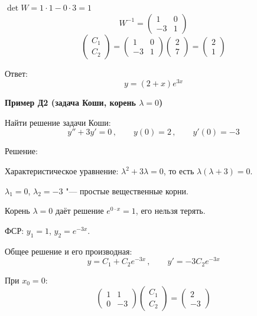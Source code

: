 \documentclass[11pt,a4paper]{article}
\newcommand{\example}[1]{\par\medskip\noindent\textbf{#1}\par\nopagebreak\smallskip}
\begin{document}
$\det W = 1 \cdot 1 - 0 \cdot 3 = 1$
\[
  W^{-1} = \begin{pmatrix} 1 & 0 \\ -3 & 1 \end{pmatrix}
\]
\[
  \begin{pmatrix} C_1 \\ C_2 \end{pmatrix}
  = \begin{pmatrix} 1 & 0 \\ -3 & 1 \end{pmatrix} \begin{pmatrix} 2 \\ 7 \end{pmatrix}
  = \begin{pmatrix} 2 \\ 1 \end{pmatrix}
\]

Ответ:
\[
  y = (2 + x)e^{3x}
\]

\example{Пример Д2 (задача Коши, корень $\lambda = 0$)}

Найти решение задачи Коши:
\[
  y'' + 3y' = 0\,, \qquad y(0) = 2\,, \qquad y'(0) = -3
\]

Решение:

Характеристическое уравнение: $\lambda^2 + 3\lambda = 0$, то есть $\lambda(\lambda + 3) = 0$.

$\lambda_1 = 0$, $\lambda_2 = -3$ "--- простые вещественные корни.

Корень $\lambda = 0$ даёт решение $e^{0 \cdot x} = 1$, его нельзя терять.

ФСР: $y_1 = 1$, $y_2 = e^{-3x}$.

Общее решение и его производная:
\[
  y = C_1 + C_2 e^{-3x}\,, \qquad y' = -3C_2 e^{-3x}
\]

При $x_0 = 0$:
\[
  \begin{pmatrix} 1 & 1 \\ 0 & -3 \end{pmatrix}
  \begin{pmatrix} C_1 \\ C_2 \end{pmatrix}
  =
  \begin{pmatrix} 2 \\ -3 \end{pmatrix}
\]
\end{document}
